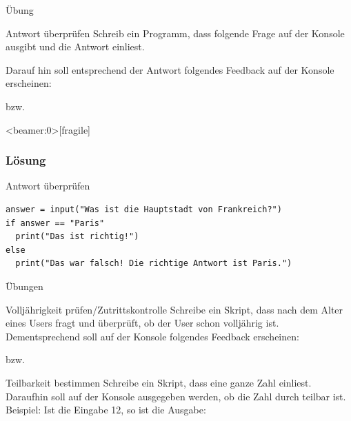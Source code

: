 \begin{frame}{Übung}

\begin{block}{Antwort überprüfen}
	\vspace{2pt}
	Schreib ein Programm, dass folgende Frage auf der Konsole ausgibt und die Antwort einliest. 
	
	
	Darauf hin soll entsprechend der Antwort folgendes Feedback auf der Konsole erscheinen: 
	
	
	bzw. 

	
\end{block}
\end{frame}

\begin{frame}<beamer:0>[fragile]
\frametitle{Lösung}
\begin{solutionblock}{Antwort überprüfen}
\begin{verbatim}
answer = input("Was ist die Hauptstadt von Frankreich?")
if answer == "Paris"
  print("Das ist richtig!")
else 
  print("Das war falsch! Die richtige Antwort ist Paris.")
\end{verbatim}
\end{solutionblock}
\end{frame}


\begin{frame}{Übungen}

	\begin{block}{Volljährigkeit prüfen/Zutrittskontrolle}
		\vspace{2pt}
		Schreibe ein Skript, dass nach dem Alter eines Users fragt und überprüft, ob der User schon volljährig ist. Dementsprechend soll auf der Konsole folgendes Feedback erscheinen:  
		
		
		 bzw.
		 
		  
	\end{block}
\pause 
\vspace{12pt}
	\begin{block}{Teilbarkeit bestimmen}
		\vspace{2pt}
		Schreibe ein Skript, dass eine ganze Zahl einliest. Daraufhin soll auf der Konsole ausgegeben werden, ob die Zahl durch  teilbar ist. Beispiel: Ist die Eingabe 12, so ist die Ausgabe:   

	\end{block}

\end{frame}

